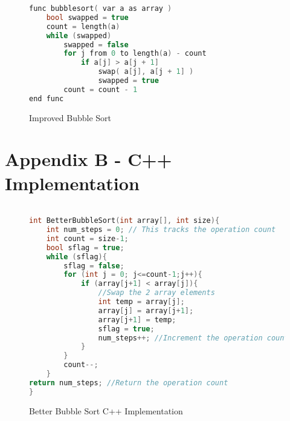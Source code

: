\documentclass[]{article}
\begin{document}
\begin{figure}[H]\label{BetterBubbleSort}
	\caption{Improved Bubble Sort}
\begin{lstlisting}[language=c++]
func bubblesort( var a as array )
	bool swapped = true
	count = length(a)
	while (swapped)
		swapped = false
		for j from 0 to length(a) - count
			if a[j] > a[j + 1]
				swap( a[j], a[j + 1] )
				swapped = true
		count = count - 1
end func
\end{lstlisting}
\end{figure}
\section{Appendix B - C++ Implementation}
\begin{figure}[H]\label{BetterBubbleSortImplemented}
	\caption{Better Bubble Sort C++ Implementation}
	\begin{lstlisting}[language=c++]

int BetterBubbleSort(int array[], int size){
	int num_steps = 0; // This tracks the operation count
	int count = size-1;
	bool sflag = true;
	while (sflag){
		sflag = false;
		for (int j = 0; j<=count-1;j++){
			if (array[j+1] < array[j]){
				//Swap the 2 array elements
				int temp = array[j];
				array[j] = array[j+1];
				array[j+1] = temp;
				sflag = true;
				num_steps++; //Increment the operation counter
			}
		}
		count--;
	}
return num_steps; //Return the operation count
}
	\end{lstlisting}
\end{figure}
\end{document}
